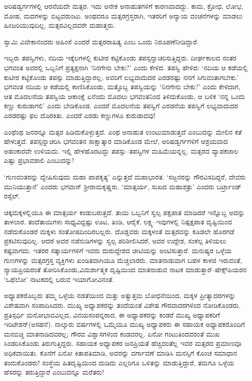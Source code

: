 ಅರಿಷಡ್ವರ್ಗಗಳಲ್ಲಿ ಆರನೆಯದೇ ಮತ್ಸರ. ಇದು ಅನೇಕ ಅನಾಹುತಗಳಿಗೆ ಕಾರಣವಾದದ್ದು. ಕಾಮ, ಕ್ರೋಧ, ಲೋಭ, ಮೋಹ, ಮದಗಳನ್ನು ಬಿಟ್ಟವರುಂಟು. ಅಂಥವರೂ ಮತ್ಸರಗ್ರಸ್ತರಾಗಿ, ಇತರರಿಗೆ ಅನ್ಯಾಯ ವಂಚನೆಗಳನ್ನು ಮಾಡಲು ಹಿಂಜರಿಯುವುದಿಲ್ಲ. ಮತ್ಸರವಿಲ್ಲದವರೇ ಮಹಾತ್ಮರು.

ಸ್ವಾಮಿ ವಿವೇಕಾನಂದರು ಅಹಿಂಸೆ ಎಂದರೆ ಮತ್ಸರರಾಹಿತ್ಯ ಎಂಬ ಒಂದು ನಿರೂಪಣೆ\break ನೀಡಿದ್ದಾರೆ.

ಇಬ್ಬರು ತಪಸ್ವಿಗಳು, ನದಿಯ ಇಕ್ಕೆಲಗಳಲ್ಲಿ ಕುಟೀರ ಕಟ್ಟಿಕೊಂಡು ತಪಸ್ಸನ್ನಾಚರಿಸುತ್ತಿದ್ದರು. ದೀರ್ಘಕಾಲದ ನಂತರ ಭಗವಂತ ಅವರಲ್ಲಿ ಒಬ್ಬನಿಗೆ ಪ್ರತ್ಯಕ್ಷನಾಗಿ ‘ನಿನಗೇನು ಬೇಕು?’ ಎಂದು ಕೇಳಿದ. ತಪಸ್ವಿ ಹೇಳಿದ: ‘ನದಿಯ ಆ ಕಡೆಯಲ್ಲಿ ಕುಟೀರ ಕಟ್ಟಿಕೊಂಡು ತಪಸ್ಸು ಮಾಡು\-ತ್ತಿದ್ದಾರಲ್ಲ, ಅವರಿಗೆ ಲಭ್ಯವಾದುದರ ಎರಡರಷ್ಟು ನನಗೆ ಸಿಗುವಂತಾಗಬೇಕು.’ ಭಗವಂತ ನದಿಯ ಆ ಕಡೆಯಲ್ಲಿ ಕಾಣಿಸಿಕೊಂಡು, ಮತ್ತೊಬ್ಬ ತಪಸ್ವಿಯನ್ನು ‘ನಿನಗೇನು ಬೇಕು?’ ಎಂದು ಕೇಳಿದಾಗ, ಆತ ಮೊದಲನೆಯ ತಪಸ್ವಿಯ ಆಕಾಂಕ್ಷೆ ಏನೆಂದು ಮೊದಲು ಭಗವಂತನಿಂದ ತಿಳಿದುಕೊಂಡು, ಆ ಬಳಿಕ ‘ನನ್ನ ಒಂದು ಕಣ್ಣು ಕುರುಡಾಗಲಿ’ ಎಂದು ಬೇಡಿಕೊಂಡ. ಎಂದರೆ ಮೊದಲನೆಯ ತಪಸ್ವಿಗೆ ಎರಡನೆಯ ತಪಸ್ವಿಗೆ ಲಭ್ಯವಾದುದರ ಎರಡರಷ್ಟು ಫಲ ದೊರಕಿತು. ಎಂದರೆ ಎರಡು ಕಣ್ಣುಗಳೂ ಕುರುಡಾದವು!

ಎಂಥೆಂಥ ಜನರನ್ನೂ ಮತ್ಸರ ಹಿಡಿದುಕೊಳ್ಳುತ್ತದೆ. ಎಂಥ ಅನಾಹುತ ಉಂಟುಮಾಡುತ್ತದೆ ಎಂಬುದನ್ನು ಮೇಲಿನ ಕತೆ ಹೇಳುತ್ತದೆ. ತಪಸ್ಸನ್ನಾಚರಿಸಿ ಭಗವಂತನ ಸಾಕ್ಷಾತ್ಕಾರ ಮಾಡಿಕೊಂಡ ಮೇಲೆ, ಅರಿಷಡ್ವರ್ಗಗಳಿಗೆ ಆಶ್ರಯವಾದ ಅಹಂಕಾರವೇ ಉಳಿಯದು. ಇಲ್ಲಿ ಹೇಳಹೊರಟದ್ದು ತಪಸ್ಸು–ತಪಸ್ವಿಗಳ ಮಹಿಮೆಯನ್ನಲ್ಲ. ಮತ್ಸರದ ವ್ಯಾಪಕಜಾಲ ಎಷ್ಟು ಪ್ರಭಾವಶಾಲಿ ಎಂಬುದನ್ನು!

‘ಗುಣವಂತರನ್ನು ದ್ವೇಷಿಸುವುದು ಮಹಾ ಪಾಪಕೃತ್ಯ’ ಎನ್ನುತ್ತದೆ ಮಹಾಭಾರತ. ‘ಸಜ್ಜನರನ್ನು ಗೌರವಿಸದಿದ್ದರೆ, ದೇವರು ಮುನಿಯುತ್ತಾನೆ’ ಎಂದರು ಭಗವಾನ್ ಶ‍್ರೀರಾಮಕೃಷ್ಣರು. ‘ಮಾತ್ಸರ್ಯ, ಸುಖದ ಮಹಾಶತ್ರು’ ಎಂದರು ಬರ್ಟ್ರಾಂಡ್ ರಸ್ಸೆಲ್.

ಚಿಕ್ಕಮಕ್ಕಳಲ್ಲಿಯೂ ಈ ಮಾತ್ಸರ್ಯ ಕಂಡುಬರುತ್ತದೆ. ತಾಯಿ ಒಬ್ಬನಿಗೆ ಸ್ವಲ್ಪ ಪಕ್ಷಪಾತ ಮಾಡಿದರೆ ಇನ್ನೊಬ್ಬ ಅದನ್ನು ತಾಳಲಾರ. ತಂದೆತಾಯಿಗಳು ಸಾಧ್ಯವಿದ್ದಷ್ಟು ಊಟ, ತಿಂಡಿ, ಆರೈಕೆ, ಲಕ್ಷ್ಯ–ಇವುಗಳಲ್ಲಿ ನಿಷ್ಪಕ್ಷಪಾತ ದೃಷ್ಟಿಯಿಂದ ನಡೆದುಕೊಂಡರೆ ಮಕ್ಕಳು ಸಂತೋಷ\-ದಿಂದಿರಬಲ್ಲರು. ದೊಡ್ಡವರು ಮಕ್ಕಳಂತೆ ಮತ್ಸರವನ್ನು ಕೂಡಲೇ ಹೊರಗಡೆ ಪ್ರಕಟಿಸುವುದಿಲ್ಲ. ಆದರೆ ಅವರ ನಡೆನುಡಿಗಳನ್ನು ಸ್ವಲ್ಪ ಪರಿಶೀಲಿಸಿದರೆ, ಅವರ ಉದ್ದೇಶ, ಸಂಕಲ್ಪ ತಿಳಿಯಲು ಕಷ್ಟವಾಗದು. ಇತರರ ಸತ್ಕಾರ್ಯಗಳಿಗೆ ಇವರು ದುರುದ್ದೇಶದ ಚೀಟಿಯನ್ನು ಅಂಟಿಸುತ್ತಾರೆ. ಮನುಷ್ಯರ ಒಳ್ಳೆಯ ಗುಣಗಳನ್ನು ಮತ್ಸರಗ್ರಸ್ತ ವ್ಯಕ್ತಿಗಳು ಖಂಡಿತವಾಗಿಯೂ ಮೆಚ್ಚಲಾರರು. ಮಾತನಾಡುವಾಗ ಬಹಳ ಕಾಳಜಿ ಇರುವಂತೆ, ನ್ಯಾಯಪ್ರಿಯರಂತೆ ತೋರಿಸಿಕೊಂಡು,\break ವಿಮರ್ಶಾತ್ಮಕ ದೃಷ್ಟಿಯಿಂದ ಮಾತನಾಡುವ ನಾಟಕ ಮಾಡುತ್ತಾರೆ–ಷೇಕ್ಸ್​ಪಿಯರನ ‘ಒಥೆಲೋ’ ನಾಟಕದಲ್ಲಿ ಬರುವ ಇಯಾಗೋವಿನಂತೆ.

ಅಧ್ಯಾಪಕರೊಬ್ಬರು ತಮ್ಮ ಒಳ್ಳೆಯ ನಡತೆಯಿಂದ ಮತ್ತು ಅತ್ಯುತ್ತಮ ಬೋಧನೆಯಿಂದ, ಮಕ್ಕಳ ಪ್ರೀತ್ಯಾದರಗಳನ್ನು ವಿಶೇಷವಾಗಿ ಸಂಪಾದಿಸಿದರು. ಮುಖ್ಯ ಅಧ್ಯಾಪಕರನ್ನು ತಂದೆಯಂತೆ ವಿಶೇಷ ಗೌರವಾದರಗಳಿಂದ ನೋಡಿಕೊಂಡರು. ಪ್ರತಿಸ್ಪರ್ಧಿ ಮನೋಭಾವವಿಲ್ಲದ, ವಿನಯಸಂಪನ್ನರಾದ, ಈ ಅಧ್ಯಾಪಕರನ್ನು ಕಂಡರೆ ಮುಖ್ಯ ಅಧ್ಯಾಪಕರಿಗೆ ಇರಿಟೇಶನ್\break (ಅಸಹನೆ). ನಾಲ್ಕಾರು ವರ್ಷಗಳಲ್ಲಿ ಒಮ್ಮೆಯೂ ಮುಖ್ಯ ಅಧ್ಯಾಪಕರು ಈ ಸಹಾಯಕ ಅಧ್ಯಾಪಕರೊಂದಿಗೆ ಮನಬಿಚ್ಚಿ ಮಾತನಾಡಿದವರಲ್ಲ; ಗೌರವ ವಿಶ್ವಾಸಗಳಿಂದ ಕಂಡವರಲ್ಲ. ಏನೋ ಗಂಟುತಿಂದವರಂತೆ ಮುಖ ಸಿಂಡರಿಸಿಕೊಂಡು ತಿರುಗುತ್ತಿದ್ದರು. ಸಹಾಯಕ ಅಧ್ಯಾಪಕರ ಜನ\-ಪ್ರಿಯತೆ ಹೆಚ್ಚಿದಂತೆಲ್ಲ ಇವರ ಮತ್ಸರದ ಪ್ರಮಾಣವೂ ಅಧಿಕವಾಯಿತು. ಕೊನೆಗೆ ಏನೋ ಕಿತಾಪತಿ\-ಮಾಡಿ, ಅವರನ್ನು ವರ್ಗಾವಣೆ ಮಾಡಿಸಿ ಮನಸ್ಸಿಗೆ ಕೊಂಚ ಸಮಾಧಾನ ತಂದುಕೊಂಡರು! ಸಂಸ್ಥೆಯ ಹಿತದೃಷ್ಟಿಯಿಂದ ದುಡಿದು ಎಲ್ಲರಿಗೂ ಒಳಿತನ್ನು ಮಾಡುತ್ತಿದ್ದಾರೆ, ತಮಗೂ ಒಳ್ಳೆಯ ಹೆಸರನ್ನು ತರುತ್ತಿದ್ದಾರೆ ಎಂಬುದನ್ನೂ ಮರೆತರು!

